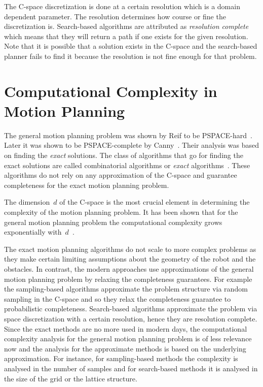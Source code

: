 \documentclass[a4paper]{report}
\begin{document}
The C-space discretization is done at a certain resolution which is a domain dependent parameter. The resolution determines how course or fine the discretization is. Search-based algorithms are attributed as \emph{resolution complete} which means that they will return a path if one exists for the given resolution. Note that it is possible that a solution exists in the C-space and the search-based planner fails to find it because the resolution is not fine enough for that problem.

\section{Computational Complexity in Motion Planning}
The general motion planning problem was shown by Reif to be PSPACE-hard~\cite{reif1979complexity}. Later it was shown to be PSPACE-complete by Canny~\cite{canny1988complexity}. Their analysis was based on finding the \emph{exact} solutions. The class of algorithms that go for finding the exact solutions are called combinatorial algorithms or \emph{exact} algorithms~\cite{lavalle2006planning}. These algorithms do not rely on any approximation of the C-space and guarantee completeness for the exact motion planning problem.

The dimension~$d$ of the C-space is the most crucial element in determining the complexity of the motion planning problem. It has been shown that for the general motion planning problem the computational complexity grows exponentially with~$d$~\cite{chazelle1991singly}.

The exact motion planning algorithms do not scale to more complex problems as they make certain limiting assumptions about the geometry of the robot and the obstacles. In contrast, the modern approaches use approximations of the general motion planning problem by relaxing the completeness guarantees. For example the sampling-based algorithms approximate the problem structure via random sampling in the C-space and so they relax the completeness guarantee to probabilistic completeness. Search-based algorithms approximate the problem via space discretization with a certain resolution, hence they are resolution complete.
Since the exact methods are no more used in modern days, the computational complexity analysis for the general motion planning problem is of less relevance now and the analysis for the approximate methods is based on the underlying approximation. For instance, for sampling-based methods the complexity is analysed in the number of samples and for search-based methods it is analysed in the size of the grid or the lattice structure.
\end{document}
